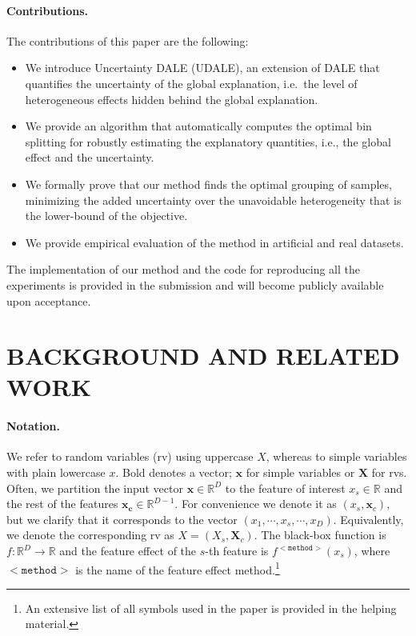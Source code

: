 \documentclass[twoside]{article}
\newcommand{\xc}{\mathbf{x_c}}
\newcommand{\xb}{\mathbf{x}}
\begin{document}
\paragraph{Contributions.} The contributions of this paper are the following:

\begin{itemize}
\item We introduce Uncertainty DALE (UDALE), an extension of DALE that
  quantifies the uncertainty of the global explanation, i.e.~the level
  of heterogeneous effects hidden behind the global explanation.
\item
  We provide an algorithm that automatically computes the optimal bin
  splitting for robustly estimating the explanatory quantities, i.e.,
  the global effect and the uncertainty.
\item We formally prove that our method finds the optimal grouping of
  samples, minimizing the added uncertainty over the unavoidable
  heterogeneity that is the lower-bound of the objective.
\item We provide empirical evaluation of the method in artificial and
  real datasets.
\end{itemize}


The implementation of our method and the code for reproducing all the
experiments is provided in the submission and will become publicly
available upon acceptance.


\section{BACKGROUND AND RELATED WORK}

\paragraph{Notation.}

We refer to random variables (rv) using uppercase \( X \), whereas to
simple variables with plain lowercase \( x \). Bold denotes a vector;
\( \xb \) for simple variables or \(\mathbf{X}\) for rvs. Often, we
partition the input vector \(\xb \in \mathbb{R}^D\) to the feature of
interest \(x_s \in \mathbb{R} \) and the rest of the features
\(\xc \in \mathbb{R}^{D-1}\). For convenience we denote it as
\((x_s, \mathbf{x}_c)\), but we clarify that it corresponds to the
vector \((x_1, \cdots , x_s, \cdots, x_D)\). Equivalently, we denote
the corresponding rv as \(X = (X_s, \mathbf{X}_c)\). The black-box
function is \(f : \mathbb{R}^D \rightarrow \mathbb{R}\) and the
feature effect of the \(s\)-th feature is
\(f^{\mathtt{<method>}}(x_s)\), where \(\mathtt{<method>}\) is the
name of the feature effect method.\footnote{An extensive list of all
  symbols used in the paper is provided in the helping material.}
\end{document}
